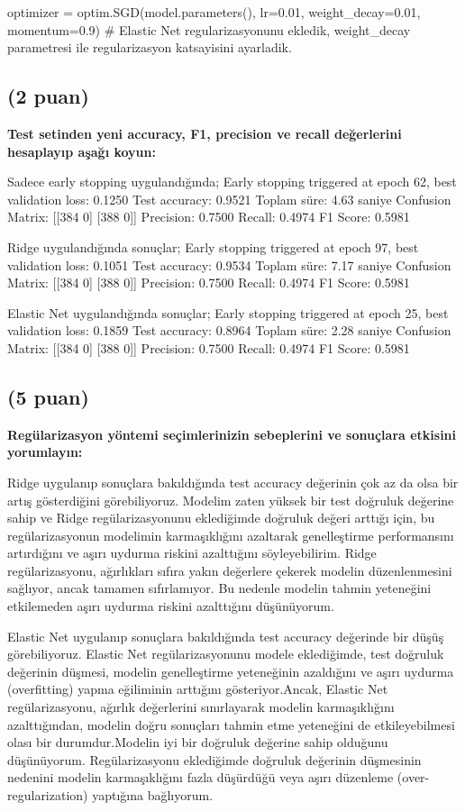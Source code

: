 \documentclass[11pt]{article}
\begin{document}
\begin{python}
    optimizer = optim.SGD(model.parameters(), lr=0.01, weight_decay=0.01, momentum=0.9)
    # Elastic Net regularizasyonunu ekledik, weight_decay parametresi ile regularizasyon katsayisini ayarladik.
\end{python}

\subsection{(2 puan)} \textbf{Test setinden yeni accuracy, F1, precision ve recall değerlerini hesaplayıp aşağı koyun:}

Sadece early stopping uygulandığında;
Early stopping triggered at epoch 62, best validation loss: 0.1250
Test accuracy: 0.9521
Toplam süre: 4.63 saniye
Confusion Matrix:
 [[384   0]
 [388   0]]
Precision: 0.7500
Recall: 0.4974
F1 Score: 0.5981

Ridge uygulandığında sonuçlar;
Early stopping triggered at epoch 97, best validation loss: 0.1051
Test accuracy: 0.9534
Toplam süre: 7.17 saniye
Confusion Matrix:
 [[384   0]
 [388   0]]
Precision: 0.7500
Recall: 0.4974
F1 Score: 0.5981

Elastic Net uygulandığında sonuçlar;
Early stopping triggered at epoch 25, best validation loss: 0.1859
Test accuracy: 0.8964
Toplam süre: 2.28 saniye
Confusion Matrix:
 [[384   0]
 [388   0]]
Precision: 0.7500
Recall: 0.4974
F1 Score: 0.5981

\subsection{(5 puan)} \textbf{Regülarizasyon yöntemi seçimlerinizin sebeplerini ve sonuçlara etkisini yorumlayın:}

Ridge uygulanıp sonuçlara bakıldığında test accuracy değerinin çok az da olsa bir artış gösterdiğini görebiliyoruz.
Modelim zaten yüksek bir test doğruluk değerine sahip ve Ridge regülarizasyonunu eklediğimde doğruluk değeri arttığı için, bu regülarizasyonun modelimin karmaşıklığını azaltarak genelleştirme performansını artırdığını ve aşırı uydurma riskini azalttığını söyleyebilirim. Ridge regülarizasyonu, ağırlıkları sıfıra yakın değerlere çekerek modelin düzenlenmesini sağlıyor, ancak tamamen sıfırlamıyor. Bu nedenle modelin tahmin yeteneğini etkilemeden aşırı uydurma riskini azalttığını düşünüyorum.


Elastic Net uygulanıp sonuçlara bakıldığında test accuracy değerinde bir düşüş görebiliyoruz.
Elastic Net regülarizasyonunu modele eklediğimde, test doğruluk değerinin düşmesi, modelin genelleştirme yeteneğinin azaldığını ve aşırı uydurma (overfitting) yapma eğiliminin arttığını gösteriyor.Ancak, Elastic Net regülarizasyonu, ağırlık değerlerini sınırlayarak modelin karmaşıklığını azalttığından, modelin doğru sonuçları tahmin etme yeteneğini de etkileyebilmesi olası bir durumdur.Modelin iyi bir doğruluk değerine sahip olduğunu düşünüyorum. Regülarizasyonu eklediğimde doğruluk değerinin düşmesinin nedenini modelin karmaşıklığını fazla düşürdüğü veya aşırı düzenleme (over-regularization) yaptığına bağlıyorum. 
\end{document}
